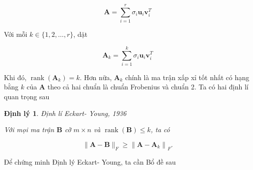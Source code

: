 \documentclass[14pt,oneside,a4paper]{report}
\newtheorem{dl}{Định lý}[section]
\numberwithin{equation}{section}
\begin{document}
$$
\mathbf{A}=\sum_{i=1}^{r} \sigma_{i} \mathbf{u}_{i} \mathbf{v}_{i}^{T}
$$

Với mỗi $k \in\{1,2, \ldots, r\}$, dặt

$$
\mathbf{A}_{k}=\sum_{i=1}^{k} \sigma_{i} \mathbf{u}_{i} \mathbf{v}_{i}^{T}
$$

Khi đó, $\operatorname{rank}\left(\mathbf{A}_{k}\right)=k$. Hơn nữa, $\mathbf{A}_{k}$ chính là ma trận xấp xỉ tốt nhất có hạng bằng $k$ của $\mathbf{A}$ theo cả hai chuẩn là chuẩn Frobenius và chuẩn 2. Ta có hai định lí quan trọng sau

\begin{dl}{Định lí Eckart- Young, 1936}  \label{eckart}

Với mọi ma trận $\mathbf{B}$ cỡ $m \times n$ và $\operatorname{rank}(\mathbf{B}) \leqslant k$, ta có

$$
\|\mathbf{A}-\mathbf{B}\|_{F} \geqslant\left\|\mathbf{A}-\mathbf{A}_{k}\right\|_{F} .
$$
\end{dl}
Để chứng minh Định lý Eckart- Young, ta cần Bổ đề sau
\end{document}
